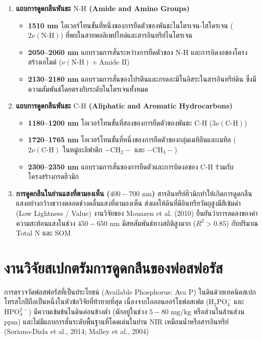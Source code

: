 \documentclass[12pt,a4paper,oneside]{book}
\begin{document}
\begin{enumerate}
    \item \textbf{แถบการดูดกลืนพันธะ $\text{N-H}$ (Amide and Amino Groups)}
    \begin{itemize}
        \item \textbf{1510 nm} โอเวอร์โทนขั้นที่หนึ่งของการยืดตัวของพันธะไนโตรเจน-ไฮโดรเจน ($2\nu(\text{N-H})$) ที่พบในสายพอลิเพปไทด์และสารอินทรีย์ไนโตรเจน
        \item \textbf{2050--2060 nm} แถบรวมการสั่นระหว่างการยืดตัวของ $\text{N-H}$ และการบิดงอของโครงสร้างเอไมด์ ($\nu(\text{N-H}) + \text{Amide II}$)
        \item \textbf{2130--2180 nm} แถบรวมการสั่นของโปรตีนและกรดอะมิโนอิสระในสารอินทรีย์ดิน ซึ่งมีความสัมพันธ์โดยตรงกับระดับไนโตรเจนทั้งหมด
    \end{itemize}
    
    \item \textbf{แถบการดูดกลืนพันธะ $\text{C-H}$ (Aliphatic and Aromatic Hydrocarbons)}
    \begin{itemize}
        \item \textbf{1180--1200 nm} โอเวอร์โทนขั้นที่สองของการยืดตัวของพันธะ $\text{C-H}$ ($3\nu(\text{C-H})$)
        \item \textbf{1720--1765 nm} โอเวอร์โทนขั้นที่หนึ่งของการยืดตัวของกลุ่มเมทิลีนและเมทิล ($2\nu(\text{C-H})$ ในหมู่อะลิฟาติก $-\text{CH}_2-$ และ $-\text{CH}_3-$)
        \item \textbf{2300--2350 nm} แถบรวมการสั่นของการยืดตัวและการบิดงอของ $\text{C-H}$ ร่วมกับโครงสร้างกรดฮิวมิก
    \end{itemize}
    
    \item \textbf{การดูดกลืนในย่านแสงที่ตามองเห็น ($400 - 700\text{ nm}$)}
    สารอินทรีย์ฮิวมิกทำให้เกิดการดูดกลืนแสงอย่างกว้างขวางตลอดช่วงคลื่นแสงที่ตามองเห็น ส่งผลให้ดินที่มีอินทรียวัตถุสูงมีสีเข้มดำ (Low Lightness / Value) งานวิจัยของ Mouazen et al. (2010) ยืนยันว่าการลดลงของค่าความสะท้อนแสงในช่วง $450 - 650\text{ nm}$ มีสหสัมพันธ์ทางสถิติสูงมาก ($R^2 > 0.85$) กับปริมาณ Total N และ SOM
\end{enumerate}

\section{งานวิจัยสเปกตรัมการดูดกลืนของฟอสฟอรัส}
การตรวจวัดฟอสฟอรัสที่เป็นประโยชน์ (Available Phosphorus: Ava P) ในดินด้วยเทคนิคสเปกโทรสโกปีถือเป็นหนึ่งในหัวข้อวิจัยที่ท้าทายที่สุด เนื่องจากไอออนออร์โธฟอสเฟต ($\text{H}_2\text{PO}_4^-$ และ $\text{HPO}_4^{2-}$) มีความเข้มข้นในดินค่อนข้างต่ำ (มักอยู่ในช่วง $5 - 80\text{ mg/kg}$ หรือส่วนในล้านส่วน ppm) และไม่มีแถบการสั่นระดับพื้นฐานที่โดดเด่นในย่าน NIR เหมือนน้ำหรือสารอินทรีย์ (Soriano-Disla et al., 2014; Malley et al., 2004)
\end{document}
